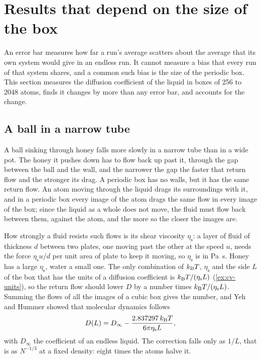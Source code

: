 \section{Results that depend on the size of the box}
\label{sec:cv-size}

An error bar measures how far a run's average scatters about the average
that its own system would give in an endless run. It cannot measure a
bias that every run of that system shares, and a common such bias is the
size of the periodic box. This section measures the diffusion
coefficient of the liquid in boxes of 256 to 2048 atoms, finds it changes
by more than any error bar, and accounts for the change.

\subsection*{A ball in a narrow tube}

A ball sinking through honey falls more slowly in a narrow tube than in a
wide pot. The honey it pushes down has to flow back up past it, through
the gap between the ball and the wall, and the narrower the gap the
faster that return flow and the stronger its drag. A periodic box has no
walls, but it has the same return flow. An atom moving through the liquid
drags its surroundings with it, and in a periodic box every image of the
atom drags the same flow in every image of the box; since the liquid as a
whole does not move, the fluid must flow back between them, against the
atom, and the more so the closer the images are.

How strongly a fluid resists such flows is its shear viscosity
$\eta_{\mathrm s}$: a layer of fluid of thickness $d$ between two plates,
one moving past the other at the speed $u$, needs the force $\eta_{\mathrm
s}u/d$ per unit area of plate to keep it moving, so $\eta_{\mathrm s}$ is in
\si{\pascal\second}. Honey has a large $\eta_{\mathrm s}$, water a small
one. The only combination of $k_{\mathrm{B}} T$, $\eta_{\mathrm s}$ and the side $L$
of the box that has the units of a diffusion coefficient is $k_{\mathrm{B}}
T/(\eta_{\mathrm s}L)$ (\cref{ex:cv-units}), so the return flow should
lower $D$ by a number times $k_{\mathrm{B}} T/(\eta_{\mathrm s}L)$. Summing the flows
of all the images of a cubic box gives the number, and Yeh and Hummer
showed that molecular dynamics follows
\begin{equation}
   D(L) = D_\infty - \frac{2.837297\,k_{\mathrm{B}} T}{6\pi\eta_{\mathrm s}L} ,
   \label{eq:cv-yh}
\end{equation}
with $D_\infty$ the coefficient of an endless liquid\cite{Yeh2004,
Dunweg1993}. The correction falls only as $1/L$, that is as $N^{-1/3}$ at
a fixed density: eight times the atoms halve it.

